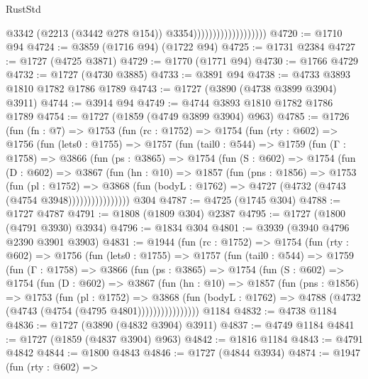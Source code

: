 \begin{lexlean}{RustStd}
\begin{coremodule}
                                          @3342
                                          (@2213 (@3442 @278 @154))
                                          @3354)))))))))))))))))))
@4720 := @1710 @94
@4724 := @3859 (@1716 @94) (@1722 @94)
@4725 := @1731 @2384
@4727 := @1727 (@4725 @3871)
@4729 := @1770 (@1771 @94)
@4730 := @1766 @4729
@4732 := @1727 (@4730 @3885)
@4733 := @3891 @94
@4738 := @4733 @3893 @1810 @1782 @1786 @1789
@4743 := @1727 (@3890 (@4738 @3899 @3904) @3911)
@4744 := @3914 @94
@4749 := @4744 @3893 @1810 @1782 @1786 @1789
@4754 := @1727 (@1859 (@4749 @3899 @3904) @963)
@4785 := @1726
    (fun (fn : @7) =>
    @1753
      (fun (rc : @1752) =>
      @1754
        (fun (rty : @602) =>
        @1756
          (fun (lets0 : @1755) =>
          @1757
            (fun (tail0 : @544) =>
            @1759
              (fun (Γ : @1758) =>
              @3866
                (fun (ps : @3865) =>
                @1754
                  (fun (S : @602) =>
                  @1754
                    (fun (D : @602) =>
                    @3867
                      (fun (hn : @10) =>
                      @1857
                        (fun (pns : @1856) =>
                        @1753
                          (fun (pl : @1752) =>
                          @3868
                            (fun (bodyL : @1762) => @4727 (@4732 (@4743 (@4754 @3948))))))))))))))))
    @304
@4787 := @4725 (@1745 @304)
@4788 := @1727 @4787
@4791 := @1808 (@1809 @304) @2387
@4795 := @1727 (@1800 (@4791 @3930) @3934)
@4796 := @1834 @304
@4801 := @3939 (@3940 @4796 @2390 @3901 @3903)
@4831 := @1944
    (fun (rc : @1752) =>
    @1754
      (fun (rty : @602) =>
      @1756
        (fun (lets0 : @1755) =>
        @1757
          (fun (tail0 : @544) =>
          @1759
            (fun (Γ : @1758) =>
            @3866
              (fun (ps : @3865) =>
              @1754
                (fun (S : @602) =>
                @1754
                  (fun (D : @602) =>
                  @3867
                    (fun (hn : @10) =>
                    @1857
                      (fun (pns : @1856) =>
                      @1753
                        (fun (pl : @1752) =>
                        @3868
                          (fun (bodyL : @1762) =>
                          @4788 (@4732 (@4743 (@4754 (@4795 @4801))))))))))))))))
    @1184
@4832 := @4738 @1184
@4836 := @1727 (@3890 (@4832 @3904) @3911)
@4837 := @4749 @1184
@4841 := @1727 (@1859 (@4837 @3904) @963)
@4842 := @1816 @1184
@4843 := @4791 @4842
@4844 := @1800 @4843
@4846 := @1727 (@4844 @3934)
@4874 := @1947
    (fun (rty : @602) =>

\end{coremodule}
\end{lexlean}
